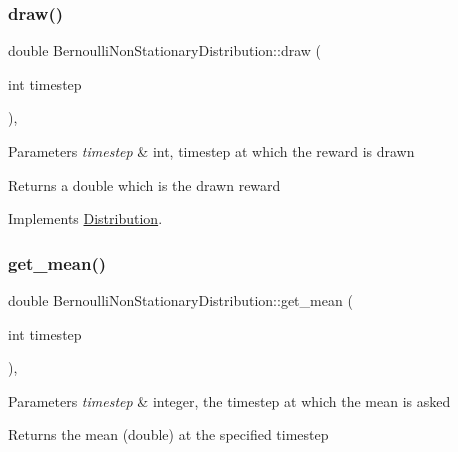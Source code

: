 \subsubsection{\texorpdfstring{draw()}{draw()}}
{\footnotesize\ttfamily double Bernoulli\+Non\+Stationary\+Distribution\+::draw (\begin{DoxyParamCaption}\item[{int}]{timestep }\end{DoxyParamCaption})\hspace{0.3cm}{\ttfamily [override]}, {\ttfamily [virtual]}}


\begin{DoxyParams}{Parameters}
{\em timestep} & int, timestep at which the reward is drawn \\
\hline
\end{DoxyParams}
\begin{DoxyReturn}{Returns}
a double which is the drawn reward 
\end{DoxyReturn}


Implements \mbox{\hyperlink{class_distribution_a742b398af4a461243028cce3c47d8080}{Distribution}}.

\mbox{\label{class_bernoulli_non_stationary_distribution_ab1cf34057259a933b7957fbff28ed442}} 
\subsubsection{\texorpdfstring{get\+\_\+mean()}{get\_mean()}}
{\footnotesize\ttfamily double Bernoulli\+Non\+Stationary\+Distribution\+::get\+\_\+mean (\begin{DoxyParamCaption}\item[{int}]{timestep }\end{DoxyParamCaption})\hspace{0.3cm}{\ttfamily [override]}, {\ttfamily [virtual]}}


\begin{DoxyParams}{Parameters}
{\em timestep} & integer, the timestep at which the mean is asked \\
\hline
\end{DoxyParams}
\begin{DoxyReturn}{Returns}
the mean (double) at the specified timestep 
\end{DoxyReturn}


